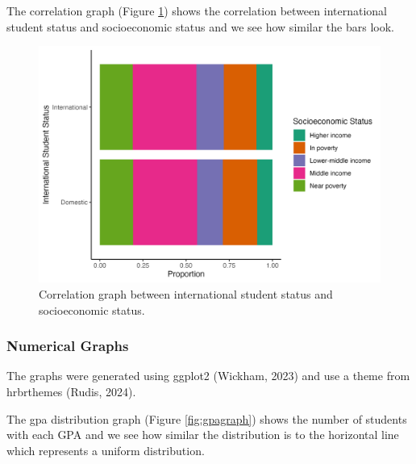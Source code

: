 \documentclass{article}
\begin{document}
The correlation graph (Figure \ref{fig:demg5}) shows the correlation between international student status and socioeconomic status and we see how similar the bars look.



\begin{figure}

{\centering \includegraphics[width=0.9\linewidth]{international_student_status_v_socioeconomic_status} 

}

\caption{Correlation graph between international student status and socioeconomic status.}\label{fig:demg5}
\end{figure}

\subsubsection{Numerical Graphs}\label{numerical-graphs}

The graphs were generated using ggplot2 (Wickham, 2023) and use a theme from hrbrthemes (Rudis, 2024).

The gpa distribution graph (Figure \ref{fig:gpagraph}) shows the number of students with each GPA and we see how similar the distribution is to the horizontal line which represents a uniform distribution.
\end{document}
